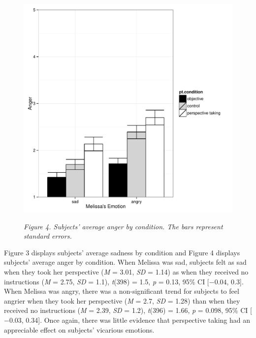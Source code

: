 \documentclass[man,a4paper,noextraspace,apacite]{apa6}\usepackage[]{graphicx}\usepackage[]{color}
\makeatletter
\def\maxwidth{ %
  \ifdim\Gin@nat@width>\linewidth
    \linewidth
  \else
    \Gin@nat@width
  \fi
}
\newenvironment{knitrout}{}{} %
\makeatother
\begin{document}
\begin{figure}
\begin{knitrout}
\color{fgcolor}
\includegraphics[width=\maxwidth]{figure/Figure4Angry-1} 

\end{knitrout}
\textit{Figure 4. Subjects' average anger by condition. The bars represent standard errors.}
\end{figure}



Figure 3 displays subjects' average sadness by condition and Figure 4 displays subjects' average anger by condition. When Melissa was sad, subjects felt as sad when they took her perspective (\textit{M} = 3.01, \textit{SD} = 1.14) as when they received no instructions (\textit{M} = 2.75, \textit{SD} = 1.1), \textit{t}(398) = 1.5, \textit{p} = 0.13, 95\% CI [\ensuremath{-0.04}, 0.3]. When Melissa was angry, there was a non-significant trend for subjects to feel angrier when they took her perspective (\textit{M} = 2.7, \textit{SD} = 1.28) than when they received no instructions (\textit{M} = 2.39, \textit{SD} = 1.2), \textit{t}(396) = 1.66, \textit{p} = 0.098, 95\% CI [\ensuremath{-0.03}, 0.34]. Once again, there was little evidence that perspective taking had an appreciable effect on subjects' vicarious emotions.
\end{document}
